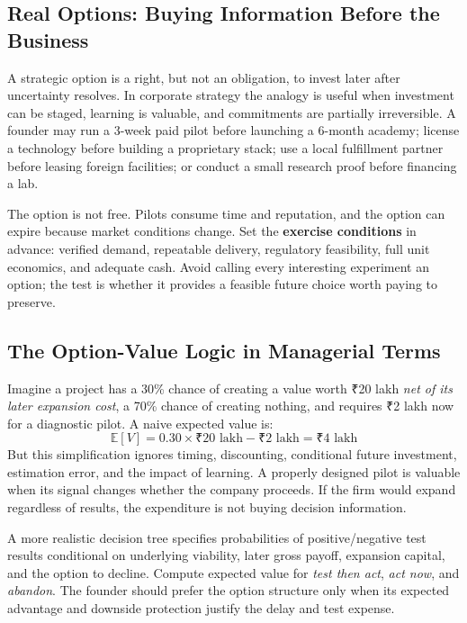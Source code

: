 \subsection{Real Options: Buying Information Before the Business}
\label{sec:real_options_buying_information}

A strategic option is a right, but not an obligation, to invest later after uncertainty resolves. In corporate strategy the analogy is useful when investment can be staged, learning is valuable, and commitments are partially irreversible. A founder may run a 3-week paid pilot before launching a 6-month academy; license a technology before building a proprietary stack; use a local fulfillment partner before leasing foreign facilities; or conduct a small research proof before financing a lab.

The option is not free. Pilots consume time and reputation, and the option can expire because market conditions change. Set the \textbf{exercise conditions} in advance: verified demand, repeatable delivery, regulatory feasibility, full unit economics, and adequate cash. Avoid calling every interesting experiment an option; the test is whether it provides a feasible future choice worth paying to preserve.

\subsection{The Option-Value Logic in Managerial Terms}
\label{sec:option_value_formula_managerial}

Imagine a project has a 30\% chance of creating a value worth ₹20 lakh \textit{net of its later expansion cost}, a 70\% chance of creating nothing, and requires ₹2 lakh now for a diagnostic pilot. A naive expected value is:
\begin{equation}
\label{eq:naive_option_value}
\mathbb{E}[V] = 0.30 \times \text{₹20 lakh} - \text{₹2 lakh} = \text{₹4 lakh}
\end{equation}
But this simplification ignores timing, discounting, conditional future investment, estimation error, and the impact of learning. A properly designed pilot is valuable when its signal changes whether the company proceeds. If the firm would expand regardless of results, the expenditure is not buying decision information.

A more realistic decision tree specifies probabilities of positive/negative test results conditional on underlying viability, later gross payoff, expansion capital, and the option to decline. Compute expected value for \textit{test then act}, \textit{act now}, and \textit{abandon}. The founder should prefer the option structure only when its expected advantage and downside protection justify the delay and test expense.

